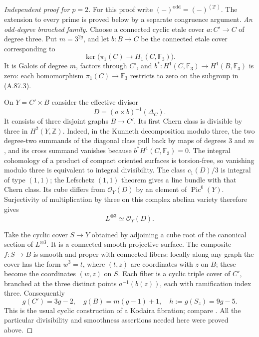 \documentclass[11pt]{article}
\begin{document}
\begin{proof}[Independent proof for \(p=2\)]
For this proof write \((-)^{\mathrm{odd}}=(-)^{(2')}\).
The extension to every prime is proved below by a separate
congruence argument.
\emph{An odd-degree branched family.}
Choose a connected cyclic etale cover
\(a:C'\to C\) of degree three. Put \(m=3^{2g}\), and let
\(b:B\to C\) be the connected etale cover corresponding to
\[
 \ker\bigl(\pi_1(C)\longrightarrow H_1(C,\mathbb F_3)\bigr).
                                                               \tag{A.87.3}
\]
It is Galois of degree \(m\), factors through \(C'\), and
\(b^*:H^1(C,\mathbb F_3)\to H^1(B,\mathbb F_3)\) is zero:
each homomorphism \(\pi_1(C)\to\mathbb F_3\) restricts to
zero on the subgroup in (A.87.3).

On \(Y=C'\times B\) consider the effective divisor
\[
          D=(a\times b)^{-1}(\Delta_C).
                                                               \tag{A.87.4}
\]
It consists of three disjoint graphs \(B\to C'\). Its first
Chern class is divisible by three in \(H^2(Y,\mathbb Z)\).
Indeed, in the Kunneth decomposition modulo three, the two
degree-two summands of the diagonal class pull back by maps of
degrees \(3\) and \(m\), and its cross summand vanishes because
\(b^*H^1(C,\mathbb F_3)=0\). The integral cohomology of a
product of compact oriented surfaces is torsion-free, so vanishing
modulo three is equivalent to integral divisibility.
The class \(c_1(D)/3\) is integral of type \((1,1)\); the
Lefschetz \((1,1)\) theorem gives a line bundle with that Chern
class. Its cube differs from \(\mathcal O_Y(D)\) by an element
of \(\operatorname{Pic}^0(Y)\). Surjectivity of multiplication
by three on this complex abelian variety therefore gives
\[
                         L^{\otimes3}\simeq\mathcal O_Y(D).
                                                               \tag{A.87.5}
\]

Take the cyclic cover \(S\to Y\) obtained by adjoining a cube
root of the canonical section of \(L^{\otimes3}\). It is a
connected smooth projective surface. The composite
\(f:S\to B\) is smooth and proper with connected fibers:
locally along any graph the cover has the form \(w^3=t\), where
\((t,z)\) are coordinates with \(z\) on \(B\); these become
the coordinates \((w,z)\) on \(S\). Each fiber is a cyclic
triple cover of \(C'\), branched at the three distinct points
\(a^{-1}(b(z))\), each with ramification index three. Consequently
\[
 g(C')=3g-2,\quad g(B)=m(g-1)+1,\quad
                  h:=g(S_z)=9g-5.                   \tag{A.87.6}
\]
This is the usual cyclic construction of a Kodaira fibration;
compare \cite[Section 1.3]{AG_Rollenske2010}. All the particular
divisibility and smoothness assertions needed here were proved
above.


\end{proof}
\end{document}
